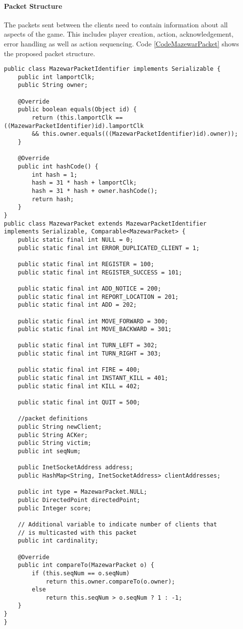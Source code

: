 \paragraph*{Packet Structure} The packets sent between the clients need to contain information about all aspects of the game. This includes player creation, action, acknowledgement, error handling as well as action sequencing. Code \ref{CodeMazewarPacket} shows the proposed packet structure. 
\newpage
{
\singlespacing
\begin{lstlisting}[caption = {[MazewarPacket.java]Structure of packets exchanged between players}, label = CodeMazewarPacket]
public class MazewarPacketIdentifier implements Serializable {
    public int lamportClk;
    public String owner;

    @Override
    public boolean equals(Object id) {
        return (this.lamportClk == ((MazewarPacketIdentifier)id).lamportClk 
        && this.owner.equals(((MazewarPacketIdentifier)id).owner));
    }

    @Override
    public int hashCode() {
        int hash = 1;
        hash = 31 * hash + lamportClk;
        hash = 31 * hash + owner.hashCode();
        return hash;
    }
}
public class MazewarPacket extends MazewarPacketIdentifier 
implements Serializable, Comparable<MazewarPacket> {
    public static final int NULL = 0;
    public static final int ERROR_DUPLICATED_CLIENT = 1;

    public static final int REGISTER = 100;
    public static final int REGISTER_SUCCESS = 101;

    public static final int ADD_NOTICE = 200;
    public static final int REPORT_LOCATION = 201;
    public static final int ADD = 202;

    public static final int MOVE_FORWARD = 300;
    public static final int MOVE_BACKWARD = 301;

    public static final int TURN_LEFT = 302;
    public static final int TURN_RIGHT = 303;

    public static final int FIRE = 400;
    public static final int INSTANT_KILL = 401;
    public static final int KILL = 402;

    public static final int QUIT = 500;

    //packet definitions
    public String newClient;
    public String ACKer;
    public String victim;
    public int seqNum;

    public InetSocketAddress address;
    public HashMap<String, InetSocketAddress> clientAddresses;

    public int type = MazewarPacket.NULL;
    public DirectedPoint directedPoint;
    public Integer score;

    // Additional variable to indicate number of clients that
    // is multicasted with this packet
    public int cardinality;

    @Override
    public int compareTo(MazewarPacket o) {
        if (this.seqNum == o.seqNum)
            return this.owner.compareTo(o.owner);
        else
            return this.seqNum > o.seqNum ? 1 : -1;
    }
}
}
\end{lstlisting}
}

